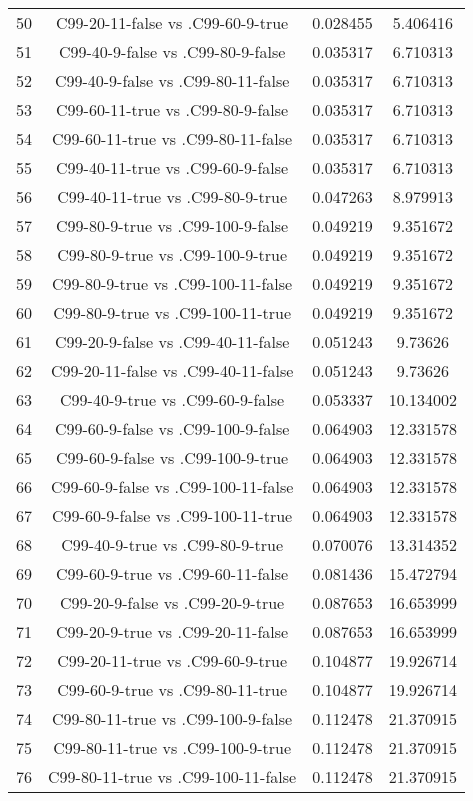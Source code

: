 \documentclass[a4paper,10pt]{article}
\begin{document}
\begin{landscape}
\begin{table}[!htp]
\begin{tabular}{cccc}
50&C99-20-11-false vs .C99-60-9-true&0.028455&5.406416\\
51&C99-40-9-false vs .C99-80-9-false&0.035317&6.710313\\
52&C99-40-9-false vs .C99-80-11-false&0.035317&6.710313\\
53&C99-60-11-true vs .C99-80-9-false&0.035317&6.710313\\
54&C99-60-11-true vs .C99-80-11-false&0.035317&6.710313\\
55&C99-40-11-true vs .C99-60-9-false&0.035317&6.710313\\
56&C99-40-11-true vs .C99-80-9-true&0.047263&8.979913\\
57&C99-80-9-true vs .C99-100-9-false&0.049219&9.351672\\
58&C99-80-9-true vs .C99-100-9-true&0.049219&9.351672\\
59&C99-80-9-true vs .C99-100-11-false&0.049219&9.351672\\
60&C99-80-9-true vs .C99-100-11-true&0.049219&9.351672\\
61&C99-20-9-false vs .C99-40-11-false&0.051243&9.73626\\
62&C99-20-11-false vs .C99-40-11-false&0.051243&9.73626\\
63&C99-40-9-true vs .C99-60-9-false&0.053337&10.134002\\
64&C99-60-9-false vs .C99-100-9-false&0.064903&12.331578\\
65&C99-60-9-false vs .C99-100-9-true&0.064903&12.331578\\
66&C99-60-9-false vs .C99-100-11-false&0.064903&12.331578\\
67&C99-60-9-false vs .C99-100-11-true&0.064903&12.331578\\
68&C99-40-9-true vs .C99-80-9-true&0.070076&13.314352\\
69&C99-60-9-true vs .C99-60-11-false&0.081436&15.472794\\
70&C99-20-9-false vs .C99-20-9-true&0.087653&16.653999\\
71&C99-20-9-true vs .C99-20-11-false&0.087653&16.653999\\
72&C99-20-11-true vs .C99-60-9-true&0.104877&19.926714\\
73&C99-60-9-true vs .C99-80-11-true&0.104877&19.926714\\
74&C99-80-11-true vs .C99-100-9-false&0.112478&21.370915\\
75&C99-80-11-true vs .C99-100-9-true&0.112478&21.370915\\
76&C99-80-11-true vs .C99-100-11-false&0.112478&21.370915\\

\end{tabular}
\end{table}
\end{landscape}
\end{document}
